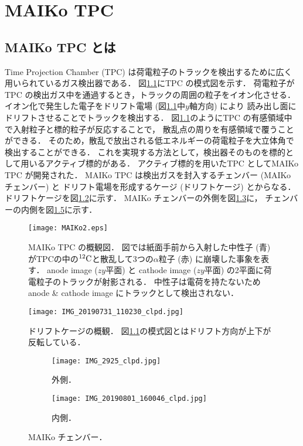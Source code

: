 \documentclass[../master]{subfiles}
\begin{document}
\chapter{MAIKo TPC}
\section{MAIKo TPC とは}
Time Projection Chamber (TPC) は荷電粒子のトラックを検出するために広く用いられているガス検出器である．
図\ref{fig::MAIKo_view}にTPC の模式図を示す．
荷電粒子がTPC の検出ガス中を通過するとき，トラックの周囲の粒子をイオン化させる．
イオン化で発生した電子をドリフト電場 (図\ref{fig::MAIKo_view}中$y$軸方向) により
読み出し面にドリフトさせることでトラックを検出する．
図\ref{fig::MAIKo_view}のようにTPC の有感領域中で入射粒子と標的粒子が反応することで，
散乱点の周りを有感領域で覆うことができる．
そのため，散乱で放出される低エネルギーの荷電粒子を大立体角で検出することができる．
これを実現する方法として，検出器そのものを標的として用いるアクティブ標的がある．
アクティブ標的を用いたTPC としてMAIKo TPC が開発された．
MAIKo TPC は検出ガスを封入するチェンバー (MAIKo チェンバー) と
ドリフト電場を形成するケージ (ドリフトケージ) とからなる．
ドリフトケージを図\ref{pic::MAIKo_cage}に示す．
MAIKo チェンバーの外側を図\ref{pic::MAIKo_chamber_out}に，
チェンバーの内側を図\ref{pic::MAIKo_chamber_in}に示す．
\begin{figure}
  \centering
  \texttt{[image: MAIKo2.eps]}
  \caption[MAIKo TPC の概観図．]{MAIKo TPC の概観図．
    図では紙面手前から入射した中性子 (青) がTPCの中の${}^{12}{\rm C}$と散乱して3つの$\alpha$粒子 (赤) に崩壊した事象を表す．
    anode image ($zy$平面) と cathode image ($zy$平面) の2平面に荷電粒子のトラックが射影される．
    中性子は電荷を持たないためanode \& cathode image にトラックとして検出されない．
  }
  \label{fig::MAIKo_view}
\end{figure}
\begin{figure}
  \centering
  \texttt{[image: IMG\_20190731\_110230\_clpd.jpg]}
  \caption[ドリフトケージの概観．]
          {ドリフトケージの概観．
          図\ref{fig::MAIKo_view}の模式図とはドリフト方向が上下が反転している．}
  \label{pic::MAIKo_cage}
\end{figure}
\begin{figure}
  \centering
  \begin{subfigure}{0.45\columnwidth}
    \centering
    \texttt{[image: IMG\_2925\_clpd.jpg]}
    \caption{外側．}
    \label{pic::MAIKo_chamber_out}
  \end{subfigure}
  \begin{subfigure}{0.45\columnwidth}
    \centering
    \texttt{[image: IMG\_20190801\_160046\_clpd.jpg]}
    \caption{内側．}
    \label{pic::MAIKo_chamber_in}
  \end{subfigure}
  \caption{MAIKo チェンバー．}
\end{figure}
\end{document}
